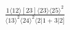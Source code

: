 \documentclass[varwidth, border=5pt]{standalone}
\begin{document}
\begin{my}
$\begin{gathered}
\scriptscriptstyle\frac{1⟨12⟩[23]⟨23⟩⟨25⟩^2}{⟨13⟩^2⟨24⟩^2⟨2|1+3|2]}
\end{gathered}$
\end{my}
\end{document}
